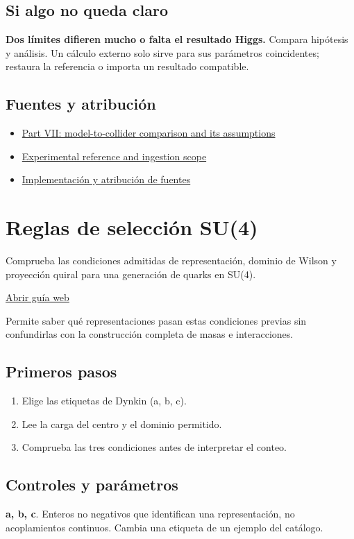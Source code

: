 \documentclass[11pt,a4paper]{article}
\begin{document}
\subsection*{Si algo no queda claro}
\textbf{Dos límites difieren mucho o falta el resultado Higgs.} Compara hipótesis y análisis. Un cálculo externo solo sirve para sus parámetros coincidentes; restaura la referencia o importa un resultado compatible.

\subsection*{Fuentes y atribución}
\begin{itemize}
\item \href{https://karlesmarin.github.io/ghu-explorer/papers/part-vii/index.html}{Part VII: model-to-collider comparison and its assumptions}
\item \href{https://karlesmarin.github.io/ghu-explorer/docs/su7-certification.html}{Experimental reference and ingestion scope}
\item \href{https://github.com/karlesmarin/ghu-lab/blob/main/src/sections/collider_section.js}{Implementación y atribución de fuentes}
\end{itemize}
\section{Reglas de selección SU(4)}
Comprueba las condiciones admitidas de representación, dominio de Wilson y proyección quiral para una generación de quarks en SU(4).

\href{https://karlesmarin.github.io/ghu-explorer/guide/es/selection/index.html}{Abrir guía web}

Permite saber qué representaciones pasan estas condiciones previas sin confundirlas con la construcción completa de masas e interacciones.
\subsection*{Primeros pasos}
\begin{enumerate}
\item Elige las etiquetas de Dynkin (a, b, c).
\item Lee la carga del centro y el dominio permitido.
\item Comprueba las tres condiciones antes de interpretar el conteo.
\end{enumerate}
\subsection*{Controles y parámetros}
\textbf{a, b, c}. Enteros no negativos que identifican una representación, no acoplamientos continuos. Cambia una etiqueta de un ejemplo del catálogo.
\end{document}
